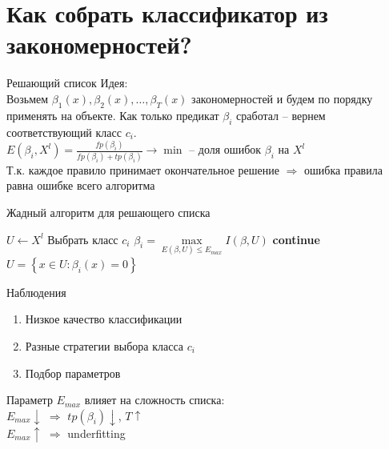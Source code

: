 \documentclass[10pt]{beamer}
\begin{document}
\section{Как собрать классификатор из закономерностей?}

\begin{frame}{Решающий список}
	\alert{Идея}:\\
	Возьмем $\beta_1(x), \beta_2(x), \dots, \beta_T(x)$ закономерностей и будем по порядку применять на объекте. 
	Как только предикат $\beta_i$ сработал -- вернем соответствующий класс $c_i$.\\
	\bigbreak
	\pause
	$E(\beta_i, X^l) = \frac{fp(\beta_i)}{fp(\beta_i)+tp(\beta_i)} \rightarrow \min$ -- доля ошибок $\beta_i$ на $X^l$\\
	\bigbreak
	Т.к. каждое правило принимает окончательное решение $\Rightarrow$ ошибка правила равна ошибке всего алгоритма
\end{frame}

\begin{frame}{Жадный алгоритм для решающего списка}
  \begin{algorithmic}[1]
      \State $U \gets X^l$
	      \State Выбрать класс $c_i$
	      \State $\beta_i = \max\limits_{E(\beta, U) \leq E_{max}} I(\beta, U)$
	        \State \textbf{continue}
	      \EndIf
	      \State $U = \left\{ x \in U: \beta_i(x) = 0 \right\}$
	        \Return
	      \EndIf
      \EndFor
    \EndFunction
  \end{algorithmic}    
\end{frame}

\begin{frame}{Наблюдения}
	\begin{enumerate}[--]
	\item Низкое качество классификации
	\item Разные стратегии выбора класса $c_i$
	\item Подбор параметров
	\end{enumerate}
	\bigbreak
	\pause
	Параметр $E_{max}$ влияет на сложность списка:\\
	$E_{max} \downarrow$ $\Rightarrow$ $tp(\beta_i) \downarrow$, $T \uparrow$\\
	$E_{max} \uparrow$ $\Rightarrow$ underfitting
\end{frame}
\end{document}
